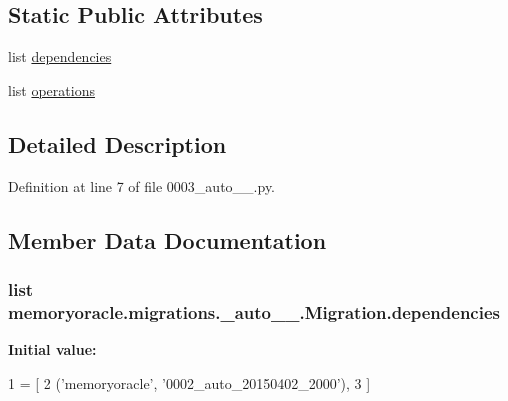 \subsection*{Static Public Attributes}
\begin{DoxyCompactItemize}
\item 
list \hyperlink{classmemoryoracle_1_1migrations_1_10003__auto__20150402__2000_1_1Migration_a791bc761a54bec3d9c6b42731106b66e}{dependencies}
\item 
list \hyperlink{classmemoryoracle_1_1migrations_1_10003__auto__20150402__2000_1_1Migration_af6549e1fb410ea57604d45ae16988cf4}{operations}
\end{DoxyCompactItemize}


\subsection{Detailed Description}


Definition at line 7 of file 0003\+\_\+auto\+\_\+\_.\+py.



\subsection{Member Data Documentation}
\hypertarget{classmemoryoracle_1_1migrations_1_10003__auto__20150402__2000_1_1Migration_a791bc761a54bec3d9c6b42731106b66e}{}
\subsubsection[{dependencies}]{\setlength{\rightskip}{0pt plus 5cm}list memoryoracle.\+migrations.\+\_\+auto\+\_\+\_.\+Migration.\+dependencies\hspace{0.3cm}{\ttfamily [static]}}\label{classmemoryoracle_1_1migrations_1_10003__auto__20150402__2000_1_1Migration_a791bc761a54bec3d9c6b42731106b66e}
{\bfseries Initial value\+:}
\begin{DoxyCode}
1 = [
2         (\textcolor{stringliteral}{'memoryoracle'}, \textcolor{stringliteral}{'0002\_auto\_20150402\_2000'}),
3     ]
\end{DoxyCode}


